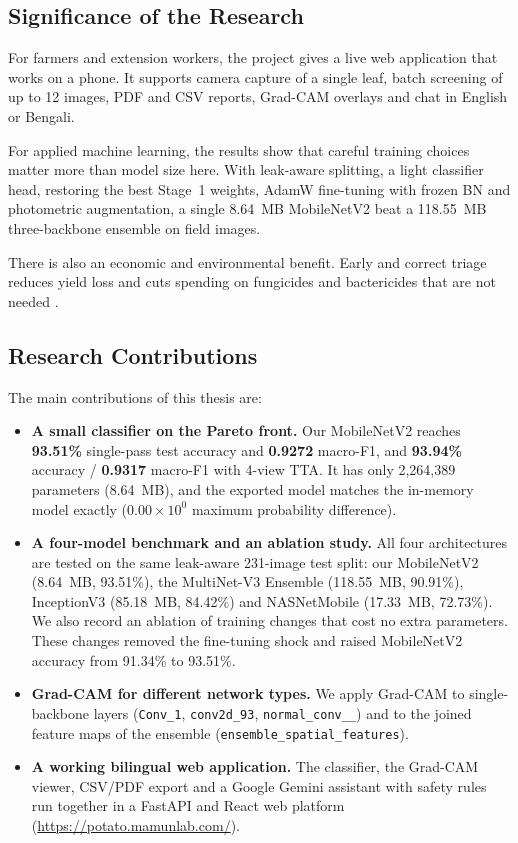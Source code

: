 \subsection{Significance of the Research}
For farmers and extension workers, the project gives a live web application that works on a phone. It supports camera capture of a single leaf, batch screening of up to 12 images, PDF and CSV reports, Grad-CAM overlays and chat in English or Bengali.

For applied machine learning, the results show that careful training choices matter more than model size here. With leak-aware splitting, a light classifier head, restoring the best Stage~1 weights, AdamW fine-tuning with frozen BN and photometric augmentation, a single 8.64~MB MobileNetV2 beat a 118.55~MB three-backbone ensemble on field images.

There is also an economic and environmental benefit. Early and correct triage reduces yield loss and cuts spending on fungicides and bactericides that are not needed \cite{strange2005plant}.

\subsection{Research Contributions}
The main contributions of this thesis are:
\begin{itemize}
    \item \textbf{A small classifier on the Pareto front.} Our MobileNetV2 reaches \textbf{93.51\%} single-pass test accuracy and \textbf{0.9272} macro-F1, and \textbf{93.94\%} accuracy / \textbf{0.9317} macro-F1 with 4-view TTA. It has only 2,264,389 parameters (8.64~MB), and the exported model matches the in-memory model exactly ($0.00 \times 10^{0}$ maximum probability difference).
    \item \textbf{A four-model benchmark and an ablation study.} All four architectures are tested on the same leak-aware 231-image test split: our MobileNetV2 (8.64~MB, 93.51\%), the MultiNet-V3 Ensemble (118.55~MB, 90.91\%), InceptionV3 (85.18~MB, 84.42\%) and NASNetMobile (17.33~MB, 72.73\%). We also record an ablation of training changes that cost no extra parameters. These changes removed the fine-tuning shock and raised MobileNetV2 accuracy from 91.34\% to 93.51\%.
    \item \textbf{Grad-CAM for different network types.} We apply Grad-CAM to single-backbone layers (\texttt{Conv\_1}, \texttt{conv2d\_93}, \texttt{normal\_\allowbreak conv\_\_}) and to the joined feature maps of the ensemble (\texttt{ensemble\_\allowbreak spatial\_\allowbreak features}).
    \item \textbf{A working bilingual web application.} The classifier, the Grad-CAM viewer, CSV/PDF export and a Google Gemini assistant with safety rules run together in a FastAPI and React web platform (\url{https://potato.mamunlab.com/}).
\end{itemize}

